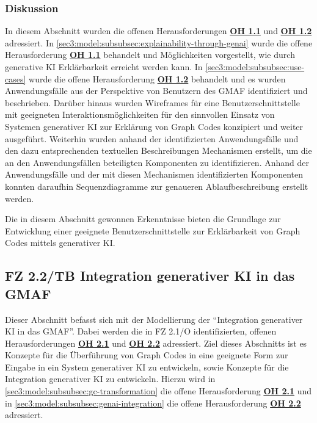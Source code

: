 \FloatBarrier

\subsubsection{Diskussion}
\label{sec3:model:subsubsec:fz1:discussion}
In diesem Abschnitt wurden die offenen Herausforderungen \hyperref[sec2:sota:oi:1.1]{\textbf{OH 1.1}} und \hyperref[sec2:sota:oi:1.1]{\textbf{OH 1.2}} adressiert.
In \cref{sec3:model:subsubsec:explainability-through-genai} wurde die offene Herausforderung \hyperref[sec2:sota:oi:1.1]{\textbf{OH 1.1}} behandelt und Möglichkeiten vorgestellt, wie durch generative KI Erklärbarkeit erreicht werden kann.
In \cref{sec3:model:subsubsec:use-cases} wurde die offene Herausforderung \hyperref[sec2:sota:oi:1.2]{\textbf{OH 1.2}} behandelt und es wurden Anwendungsfälle aus der Perspektive von Benutzern des GMAF identifiziert und beschrieben.
Darüber hinaus wurden Wireframes für eine Benutzerschnittstelle mit geeigneten Interaktionsmöglichkeiten für den sinnvollen Einsatz von Systemen generativer KI zur Erklärung von Graph Codes konzipiert und weiter ausgeführt.
Weiterhin wurden anhand der identifizierten Anwendungsfälle und den dazu entsprechenden textuellen Beschreibungen Mechanismen erstellt, um die an den Anwendungsfällen beteiligten Komponenten zu identifizieren.
Anhand der Anwendungsfälle und der mit diesen Mechanismen identifizierten Komponenten konnten daraufhin Sequenzdiagramme zur genaueren Ablaufbeschreibung erstellt werden.

Die in diesem Abschnitt gewonnen Erkenntnisse bieten die Grundlage zur Entwicklung einer geeignete Benutzerschnittstelle zur Erklärbarkeit von Graph Codes mittels generativer KI.

\clearpage

\subsection{FZ 2.2/TB Integration generativer KI in das GMAF}
\label{sec3:model:subsec:fz-integration}
Dieser Abschnitt befasst sich mit der Modellierung der \enquote{Integration generativer KI in das GMAF}. Dabei werden die in FZ 2.1/O identifizierten, offenen Herausforderungen \hyperref[sec2:sota:oi:2.1]{\textbf{OH 2.1}} und \hyperref[sec2:sota:oi:2.2]{\textbf{OH 2.2}} adressiert.
Ziel dieses Abschnitts ist es Konzepte für die Überführung von Graph Codes in eine geeignete Form zur Eingabe in ein System generativer KI zu entwickeln, sowie Konzepte für die Integration generativer KI zu entwickeln.
Hierzu wird in \cref{sec3:model:subsubsec:gc-transformation} die offene Herausforderung \hyperref[sec2:sota:oi:2.1]{\textbf{OH 2.1}} und in \cref{sec3:model:subsubsec:genai-integration} die offene Herausforderung \hyperref[sec2:sota:oi:2.2]{\textbf{OH 2.2}} adressiert.

